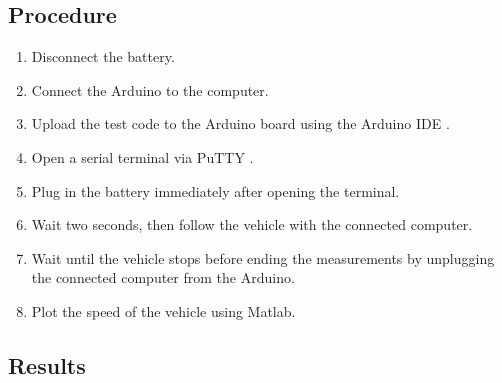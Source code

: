 \subsection{Procedure}

\begin{enumerate}
  \item Disconnect the battery.
  \item Connect the Arduino to the computer.
  \item Upload the test code to the Arduino board using the Arduino IDE  \cite{ArduinoIDE}.
  \item Open a serial terminal via PuTTY \cite{PuTTY}.
  \item Plug in the battery immediately after opening the terminal.
  \item Wait two seconds, then follow the vehicle with the connected computer.
  \item Wait until the vehicle stops before ending the measurements by unplugging the connected computer from the Arduino.
  \item Plot the speed of the vehicle using Matlab.
\end{enumerate}

\subsection{Results} \label{inertiaTestResults}

